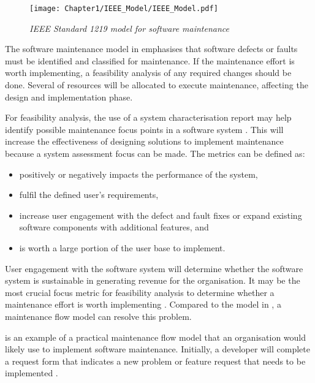 \begin{figure}[!htb]
	\centering %
	\texttt{[image: Chapter1/IEEE\_Model/IEEE\_Model.pdf]}
	\caption[IEEE Standard 1219 model for software maintenance]
	{\textit{IEEE Standard 1219 model for software maintenance \cite{Ren2011}}} \label{fig:ch1_ieeeModel}
\end{figure}

The software maintenance model in  emphasises that software defects or faults must be identified and classified for maintenance. If the maintenance effort is worth implementing, a feasibility analysis of any required changes should be done. Several of resources will be allocated to execute maintenance, affecting the design and implementation phase.\par For feasibility analysis, the use of a system characterisation report may help identify possible maintenance focus points in a software system \cite{Araujo2021}. This will increase the effectiveness of designing solutions to implement maintenance because a system assessment focus can be made. The metrics can be defined as:

\begin{itemize}
	\item positively or negatively impacts the performance of the system,
	\item fulfil the defined user's requirements,
	\item increase user engagement with the defect and fault fixes or expand existing software components with additional features, and
	\item is worth a large portion of the user base to implement.
\end{itemize}

User engagement with the software system will determine whether the software system is sustainable in generating revenue for the organisation. It may be the most crucial focus metric for feasibility analysis to determine whether a maintenance effort is worth implementing \cite{Araujo2021}. Compared to the model in , a maintenance flow model can resolve this problem.  

 is an example of a practical maintenance flow model that an organisation would likely use to implement software maintenance. Initially, a developer will complete a request form that indicates a new problem or feature request that needs to be implemented \cite{Tang2010}. 

